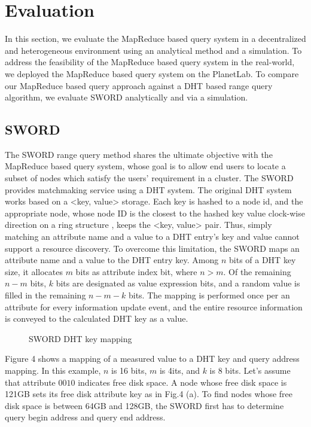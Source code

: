 \documentclass{acm_proc_article-sp}
\begin{document}
\section{Evaluation}
In this section, we evaluate the MapReduce based query system in a decentralized and heterogeneous environment using an analytical method and a simulation. 
To address the feasibility of the MapReduce based query system in the real-world, we deployed the MapReduce based query system on the PlanetLab. 
To compare our MapReduce based query approach against a DHT based range query algorithm, we evaluate SWORD\cite{sword} analytically and via a simulation.
\subsection{SWORD}
The SWORD range query method shares the ultimate objective with the MapReduce based query system, whose goal is to allow end users to locate a subset of nodes which satisfy the users' requirement in a cluster.
The SWORD provides matchmaking service using a DHT system. The original DHT system works based on a <key, value> storage. 
Each key is hashed to a node id, and the appropriate node, whose node ID is the closest to the hashed key value clock-wise direction on a ring structure\cite{chord} \cite{pastry}, keeps the <key, value> pair. 
Thus, simply matching an attribute name and a value to a DHT entry's key and value cannot support a resource discovery. 
To overcome this limitation, the SWORD maps an attribute name and a value to the DHT entry key. Among $n$ bits of a DHT key size, it allocates $m$ bits as attribute index bit, where $n>m$. 
Of the remaining $n-m$ bits, $k$ bits are designated as value expression bits, and a random value is filled in the remaining $n-m-k$ bits.
The mapping is performed once per an attribute for every information update event, and the entire resource information is conveyed to the calculated DHT key as a value.
\begin{figure}
\centering
{}
\caption{SWORD DHT key mapping}
\end{figure}
Figure 4 shows a mapping of a measured value to a DHT key and query address mapping. In this example, $n$ is 16 bits, $m$ is 4its, and $k$ is 8 bits. Let's assume that attribute $0010$ indicates free disk space.
A node whose free disk space is 121GB sets its free disk attribute key as in Fig.4 (a).
To find nodes whose free disk space is between 64GB and 128GB, the SWORD first has to determine query begin address and query end address. 
\end{document}

